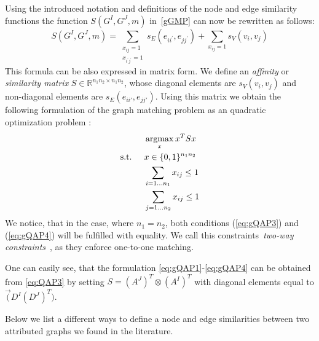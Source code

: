 Using the introduced notation and definitions of the node and edge similarity functions the function $S(G^I,G^J,m)$ in~\eqref{gGMP} can now be rewritten as follows:
\begin{equation}\label{eq:sumQAP}
	S(G^I,G^J,m)=\sum_{\substack{x_{ij}=1\\x_{i^\prime j^\prime}=1}}s_E(e_{ii^\prime},e_{jj^\prime}) + \sum_{x_{ij}=1}s_V(v_{i},v_{j})
\end{equation}
This formula can be also expressed in matrix form. We define an \emph{affinity} or \emph{similarity matrix} $S\in\mathbb{R}^{n_1n_2\times n_1n_2}$, whose diagonal elements are $s_V(v_i, v_j)$ and non-diagonal elements are $s_E(e_{ii\prime}, e_{jj\prime})$. Using this matrix we obtain the following formulation of the graph matching problem as an quadratic optimization problem \cite{Cho2010_RRWM, Cho2012_ProgressiveGM,Cho2014_Haystack, Conte2004,Rangarajan1996_GAGM,Leordeanu2005_SM,Leordeanu2009_IPFP}:
\begin{alignat}{2}
    &     && \argmax_x{x^TSx}                           \label{eq:gQAP1}\\ %
    & \text{s.t. } &&  x\in \{0,1\}^{n_1n_2}            \label{eq:gQAP2}\\
    &             &&  \sum_{i=1\dots n_1} x_{ij}\le 1    \label{eq:gQAP3}\\
    &             &&  \sum_{j=1\dots n_2} x_{ij}\le 1    \label{eq:gQAP4}
\end{alignat}
We notice, that in the case, where $n_1=n_2$, both conditions (\ref{eq:gQAP3}) and (\ref{eq:gQAP4}) will be fulfilled with equality. We call this constraints~\emph{two-way constraints}~\cite{Rangarajan1996_GAGM}, as they enforce one-to-one matching.

One can easily see, that the formulation \eqref{eq:gQAP1}-\eqref{eq:gQAP4} can be obtained from \eqref{eq:QAP3} by setting $S=(A^J)^T\otimes(A^I)^T$ with diagonal elements equal to $\vec(D^I(D^J)^T)$.

Below we list a different ways to define a node and edge similarities between two attributed graphs we found in the literature.

